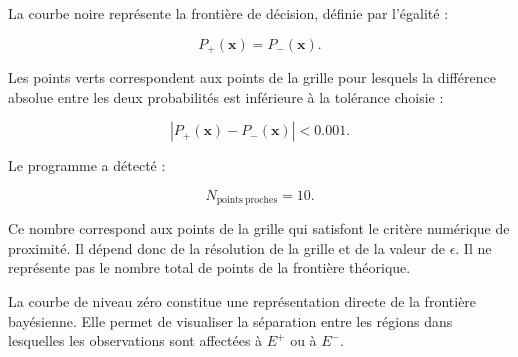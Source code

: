 La courbe noire représente la frontière de décision,
définie par l'égalité :

\begin{equation}
P_+(\mathbf{x})=P_-(\mathbf{x}).
\end{equation}

Les points verts correspondent aux points de la grille
pour lesquels la différence absolue entre les deux
probabilités est inférieure à la tolérance choisie :

\begin{equation}
|P_+(\mathbf{x})-P_-(\mathbf{x})|<0.001.
\end{equation}

Le programme a détecté :

\begin{equation}
\boxed{
N_{\mathrm{points\ proches}}=10.
}
\end{equation}

Ce nombre correspond aux points de la grille qui
satisfont le critère numérique de proximité. Il dépend
donc de la résolution de la grille et de la valeur de
$\epsilon$. Il ne représente pas le nombre total de
points de la frontière théorique.

La courbe de niveau zéro constitue une représentation
directe de la frontière bayésienne. Elle permet de
visualiser la séparation entre les régions dans
lesquelles les observations sont affectées à $E^+$
ou à $E^-$.

